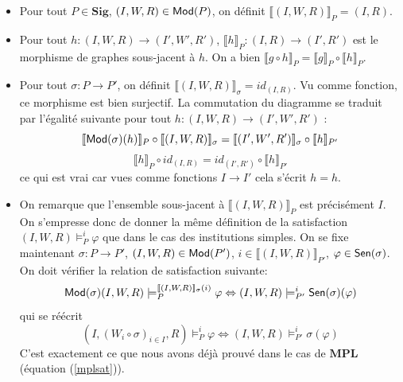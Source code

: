 \documentclass[11pt,a4paper]{report}
\newcommand{\ph}{\varphi}
\newcommand{\itemz}{\item[$\triangleright$]}
\newcommand{\gr}{\textbf}
\renewcommand{\iff}{\Leftrightarrow}
\newcommand{\lb}{\llbracket}
\newcommand{\rb}{\rrbracket}
\newcommand{\info}[1]{\text{{\fontfamily{lmss}\selectfont #1}}}
\newcommand{\Mod}{\info{Mod}}
\newcommand{\Sen}{\info{Sen}}
\newcommand{\1}{\mathbbm{1}}
\begin{document}
\begin{itemize}
\setlength\itemsep{-0.3em}
\itemz Pour tout $P \in \gr{Sig}$, $(I,W,R) \in \Mod(P)$, on définit $\lb (I,W,R) \rb_P = (I,R)$.
\itemz Pour tout $h : (I,W,R) \to (I',W',R')$, $\lb h \rb_P : (I,R) \to (I',R')$ est le morphisme de graphes sous-jacent à $h$. On a bien $\lb g \circ h \rb_P = \lb g \rb_P \circ \lb h \rb_P$.
\itemz Pour tout $\sigma : P \to P'$, on définit $\lb (I,W,R) \rb_\sigma = id_{(I,R)}$. Vu comme fonction, ce morphisme est bien surjectif. La commutation du diagramme se traduit par l'égalité suivante pour tout $h : (I,W,R) \to (I',W',R')$ :
\[ \lb \Mod(\sigma)(h) \rb_P \circ \lb (I,W,R) \rb_\sigma =  \lb (I',W',R') \rb_\sigma \circ \lb h \rb_{P'}\]
\[ \lb h \rb_P \circ id_{(I,R)} = id_{(I',R')} \circ \lb h \rb_{P'} \]
ce qui est vrai car vues comme fonctions $I \to I'$ cela s'écrit $h = h$.
\itemz On remarque que l'ensemble sous-jacent à $\lb (I,W,R) \rb_P$ est précisément $I$. On s'empresse donc de donner la même définition de la satisfaction $(I,W,R) \models_P^i \ph$ que dans le cas des institutions simples. On se fixe maintenant $\sigma : P \to P'$, $(I,W,R) \in \Mod(P')$, $i \in \lb (I,W,R) \rb_{P'}$, $\ph \in \Sen(\sigma)$. On doit vérifier la relation de satisfaction suivante:
\[ \Mod(\sigma)(I,W,R) \models_P^{\lb (I,W,R) \rb_\sigma (i)} \ph \iff (I,W,R) \models_{P'}^i \Sen(\sigma)(\ph)\]
qui se réécrit
\[ (I,(W_i \circ \sigma)_{i \in I}, R) \models_P^{i} \ph \iff (I,W,R) \models_{P'}^i \sigma(\ph) \]
C'est exactement ce que nous avons déjà prouvé dans le cas de $\gr{MPL}$ (équation (\ref{mplsat})).
\end{itemize}
\end{document}
